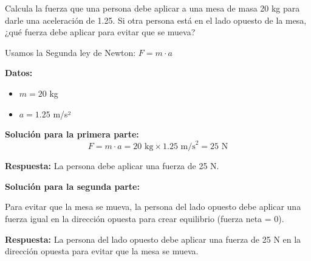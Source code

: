 \begin{exercise}
    Calcula la fuerza que una persona debe aplicar a una mesa de masa 20 kg para darle una aceleración de \qty{1.25}{\mpss}.
    Si otra persona está en el lado opuesto de la mesa, ¿qué fuerza debe aplicar para evitar que se mueva?

    \begin{solu}
        Usamos la Segunda ley de Newton: $F = m \cdot a$

        \textbf{Datos:}
        \begin{itemize}
            \item $m = 20$ kg
            \item $a = 1.25$ m/s²
        \end{itemize}

        \textbf{Solución para la primera parte:}
        $$F = m \cdot a = 20\text{ kg} \times 1.25\text{ m/s}^2 = 25\text{ N}$$

        \textbf{Respuesta:} La persona debe aplicar una fuerza de 25 N.

        \textbf{Solución para la segunda parte:}

        Para evitar que la mesa se mueva, la persona del lado opuesto debe aplicar una fuerza igual en la dirección opuesta para crear equilibrio (fuerza neta = 0).

        \textbf{Respuesta:} La persona del lado opuesto debe aplicar una fuerza de 25 N en la dirección opuesta para evitar que la mesa se mueva.
    \end{solu}
\end{exercise}

